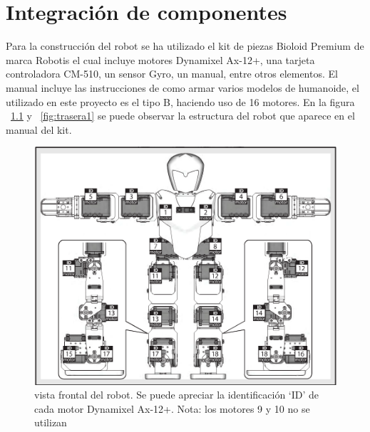 \chapter{Integración de componentes}\label{chapter:Integracion_de_componentes}

Para la construcción del robot se ha utilizado el kit de piezas Bioloid Premium de marca Robotis el cual incluye motores Dynamixel Ax-12+, una tarjeta controladora CM-510, un sensor Gyro, un manual, entre otros elementos. El manual incluye las instrucciones de como armar varios modelos de humanoide, el utilizado en este proyecto es el tipo B, haciendo uso de 16 motores. En la figura ~\ref{fig:frontal} y ~\ref{fig:trasera1} se puede observar la estructura del robot que aparece en el manual del kit. 

\begin{figure}[hbtp]
\centering
\includegraphics[scale=0.3]{imagenes/Robot.png}
\caption{vista frontal del robot. Se puede apreciar la identificación ‘ID’ de cada motor Dynamixel Ax-12+. Nota: los motores 9 y 10 no se utilizan}
\label{fig:frontal}
\end{figure}

